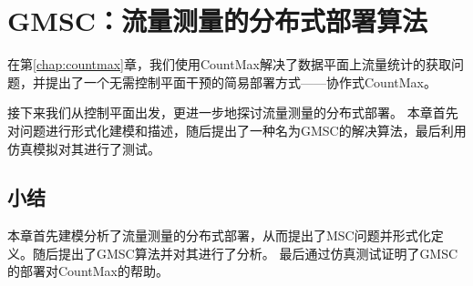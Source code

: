 %
\chapter{GMSC：流量测量的分布式部署算法}\label{chap:gmsc}
在第\ref{chap:countmax}章，我们使用CountMax解决了数据平面上流量统计的获取问题，并提出了一个无需控制平面干预的简易部署方式——协作式CountMax。

接下来我们从控制平面出发，更进一步地探讨流量测量的分布式部署。
本章首先对问题进行形式化建模和描述，随后提出了一种名为GMSC的解决算法，最后利用仿真模拟对其进行了测试。





\section{小结}

本章首先建模分析了流量测量的分布式部署，从而提出了MSC问题并形式化定义。随后提出了GMSC算法并对其进行了分析。
最后通过仿真测试证明了GMSC的部署对CountMax的帮助。